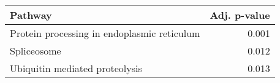 \begin{tabular}{lr}
\toprule
                                     Pathway &  Adj. p-value \\
\midrule
 Protein processing in endoplasmic reticulum &         0.001 \\
                                 Spliceosome &         0.012 \\
              Ubiquitin mediated proteolysis &         0.013 \\
\bottomrule
\end{tabular}
